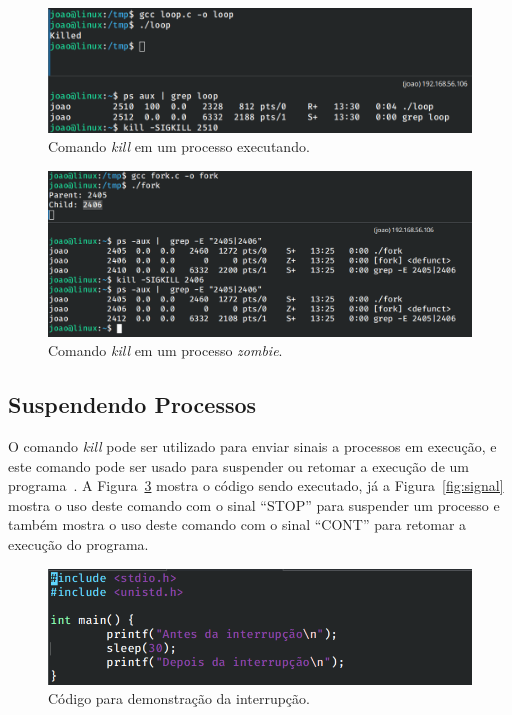 \documentclass[
	12pt,				%
	oneside,   	        %
	a4paper,			%
	english,			%
	french,				%
	spanish,			%
	brazil,				%
	]{pacotes/abntex2}
\begin{document}
\begin{figure}[H]
  \centering
  \includegraphics[scale=0.45]{figuras/kill.png}
  \caption{Comando \textit{kill} em um processo executando.}
  \label{fig:kill}
\end{figure}

\begin{figure}[H]
  \centering
  \includegraphics[scale=0.45]{figuras/zombie.png}
  \caption{Comando \textit{kill} em um processo \textit{zombie}.}
  \label{fig:zombie}
\end{figure}

\subsection{Suspendendo Processos}
\label{subsec:suspendendo}

O comando \textit{kill} pode ser utilizado para enviar sinais a processos em execução, e este comando pode ser usado para suspender ou retomar a execução de um programa~\cite{guiafoca}. A Figura~\ref{fig:interrupt} mostra o código sendo executado, já a  Figura~\ref{fig:signal} mostra o uso deste comando com o sinal ``STOP'' para suspender um processo e também mostra o uso deste comando com o sinal ``CONT'' para retomar a execução do programa.

\begin{figure}[H]
  \centering
  \includegraphics[scale=0.45]{figuras/interrupt.png}
  \caption{Código para demonstração da interrupção.}
  \label{fig:interrupt}
\end{figure}
\end{document}
